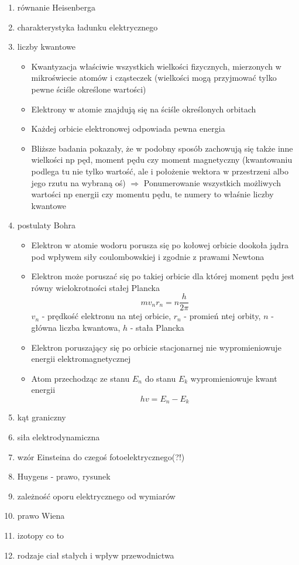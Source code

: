 \documentclass[12pt,a4paper]{article}
\begin{document}
\begin {enumerate}

\item równanie Heisenberga

\item charakterystyka ładunku elektrycznego

\item liczby kwantowe

 \begin{itemize}
 	\item Kwantyzacja właściwie wszystkich wielkości fizycznych, mierzonych w mikroświecie atomów i cząsteczek (wielkości mogą przyjmować tylko pewne ściśle określone wartości)
 	\item Elektrony w atomie znajdują się na ściśle określonych orbitach
 	\item Każdej orbicie elektronowej odpowiada pewna energia
 	\item Bliższe badania pokazały, że w podobny sposób zachowują się także inne wielkości np pęd, moment pędu czy moment magnetyczny (kwantowaniu podlega tu nie tylko wartość, ale i położenie wektora w przestrzeni albo jego rzutu na wybraną oś) $\Rightarrow$ Ponumerowanie wszystkich możliwych wartości np energii czy momentu pędu, te numery to właśnie liczby kwantowe
 \end{itemize}

\item postulaty Bohra

 \begin{itemize}
 	\item Elektron w atomie wodoru porusza się po kołowej orbicie dookoła jądra pod wpływem siły coulombowskiej i zgodnie z prawami Newtona
 	\item Elektron może poruszać się po takiej orbicie dla której moment pędu jest równy wielokrotności stałej Plancka
 	$$mv_nr_n=n\frac{h}{2\pi}$$
 	$v_n$ - prędkość elektronu na ntej orbicie, $r_n$ - promień ntej orbity, $n$ - główna liczba kwantowa, $h$ - stała Plancka
 	\item Elektron poruszający się po orbicie stacjonarnej nie wypromieniowuje energii elektromagnetycznej
 	\item Atom przechodząc ze stanu $E_n$ do stanu $E_k$ wypromieniowuje kwant energii
 	$$hv = E_n-E_k$$
 \end{itemize}

\item kąt graniczny

\item siła elektrodynamiczna

\item wzór Einsteina do czegoś fotoelektrycznego(?!)

\item Huygens - prawo, rysunek

\item zależność oporu elektrycznego od wymiarów

\item prawo Wiena

\item izotopy co to

\item rodzaje ciał stałych i wpływ przewodnictwa


\end {enumerate}
\end{document}
